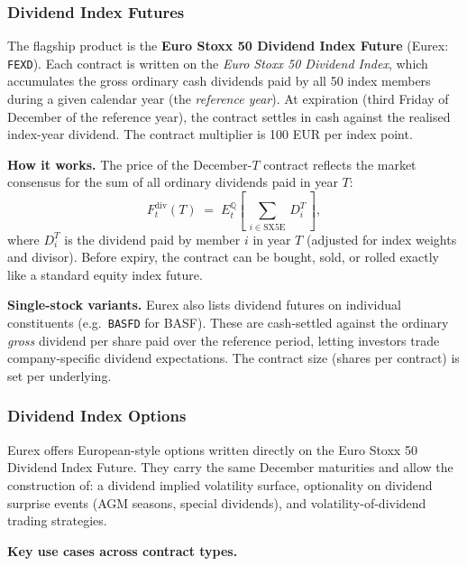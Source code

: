 \documentclass[12pt,a4paper]{article}
\begin{document}
\subsubsection*{Dividend Index Futures}
 
The flagship product is the \textbf{Euro Stoxx 50 Dividend Index Future} (Eurex:
\texttt{FEXD}).
Each contract is written on the \emph{Euro Stoxx 50 Dividend Index}, which accumulates
the gross ordinary cash dividends paid by all 50 index members during a given
calendar year (the \emph{reference year}).
At expiration (third Friday of December of the reference year), the contract settles
in cash against the realised index-year dividend.
The contract multiplier is 100 EUR per index point.
 
\smallskip
\textbf{How it works.} The price of the December-$T$ contract reflects the market
consensus for the sum of all ordinary dividends paid in year $T$:
\[
F_t^{\text{div}}(T) \;=\; E_t^{\mathbb{Q}}\!\left[\,\sum_{i\in\text{SX5E}}\,D_i^T\,\right],
\]
where $D_i^T$ is the dividend paid by member $i$ in year $T$ (adjusted for index weights
and divisor). Before expiry, the contract can be bought, sold, or rolled exactly like a
standard equity index future.
 
\smallskip
\textbf{Single-stock variants.} Eurex also lists dividend futures on individual
constituents (e.g.\ \texttt{BASFD} for BASF). These are cash-settled against the
ordinary \emph{gross} dividend per share paid over the reference period, letting
investors trade company-specific dividend expectations. The contract size (shares per
contract) is set per underlying.
 
\subsubsection*{Dividend Index Options}
 
Eurex offers European-style options written directly on the Euro Stoxx 50 Dividend Index
Future. They carry the same December maturities and allow the construction of:
a dividend implied volatility surface, optionality on dividend surprise events
(AGM seasons, special dividends), and volatility-of-dividend trading strategies.
 
\smallskip
\textbf{Key use cases across contract types.}
 
\end{document}
